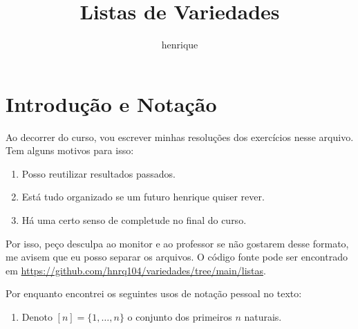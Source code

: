 \documentclass{article}
\author{henrique}
\title{Listas de Variedades}
\theoremstyle{definition}
\begin{document}
\maketitle

\tableofcontents
\setcounter{section}{-1}

\section{Introdução e Notação}
Ao decorrer do curso, vou escrever minhas resoluções dos exercícios nesse arquivo. Tem alguns motivos para isso:
\begin{enumerate}
	\item Posso reutilizar resultados passados.
	\item Está tudo organizado se um futuro henrique quiser rever.
	\item Há uma certo senso de completude no final do curso.
\end{enumerate}
Por isso, peço desculpa ao monitor e ao professor se não gostarem desse formato, me avisem que eu posso separar os arquivos.
O código fonte pode ser encontrado em \url{https://github.com/hnrq104/variedades/tree/main/listas}.

Por enquanto encontrei os seguintes usos de notação pessoal no texto:
\begin{enumerate}
	\item Denoto $[n] = \{1, \dots, n \}$ o conjunto dos primeiros $n$ naturais.
\end{enumerate}





\end{document}
